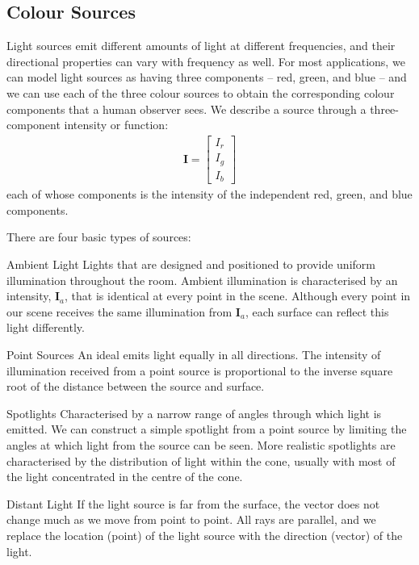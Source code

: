\documentclass[../COS3712_Notes.tex]{subfiles}
\begin{document}
      \subsection{Colour Sources}
        Light sources emit different amounts of light at different frequencies,
        and their directional properties can vary with frequency as well.
        For most applications, we can model light sources as having three components
        -- red, green, and blue --
        and we can use each of the three colour sources to obtain the corresponding
        colour components that a human observer sees.
        We describe a source through a three-component intensity or  function:
        \begin{align*}
          \mathbf{I} = \begin{bmatrix}
            I_r \\
            I_g \\
            I_b
          \end{bmatrix}
        \end{align*}
        each of whose components is the intensity of the independent red, green, and blue components.

        There are four basic types of sources:
        \begin{descriptenum}
          \item[Ambient Light] Lights that are designed and positioned to provide uniform
            illumination throughout the room.
            Ambient illumination is characterised by an intensity, $\mathbf{I}_a$,
            that is identical at every point in the scene.
            Although every point in our scene receives the same illumination from $\mathbf{I}_a$,
            each surface can reflect this light differently.
          \item[Point Sources] An ideal  emits light equally
            in all directions.
            The intensity of illumination received from a point source is proportional to the
            inverse square root of the distance between the source and surface.
          \item[Spotlights] Characterised by a narrow range of angles through which light is
            emitted.
            We can construct a simple spotlight from a point source by limiting the angles
            at which light from the source can be seen.
            More realistic spotlights are characterised by the distribution of light
            within the cone, usually with most of the light concentrated in the
            centre of the cone.
          \item[Distant Light] If the light source is far from the surface, the vector
            does not change much as we move from point to point.
            All rays are parallel, and we replace the location (point) of the light source
            with the direction (vector) of the light.
        \end{descriptenum}
\end{document}
